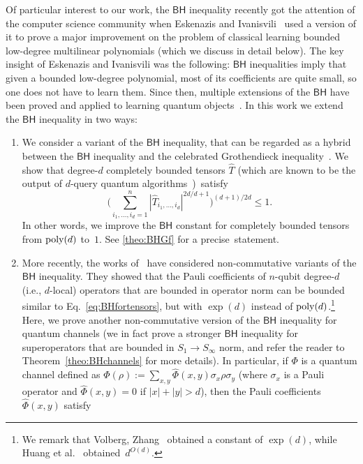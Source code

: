 \documentclass[11pt]{article}
\newcommand{\BH}{\textsf{BH}}
\theoremstyle{plain}
\newcommand{\poly}{\mbox{\rm poly}}
\theoremstyle{plain}
\theoremstyle{definition}
\theoremstyle{remark}
\theoremstyle{named}
\begin{document}
Of particular interest to our work, the $\BH$ inequality recently got the attention of the computer science community when  Eskenazis and Ivanisvili~\cite{eskenazis2022learning} used a version of it to prove a major improvement on the problem of classical learning bounded low-degree multilinear polynomials (which we discuss in detail below).
The key insight of Eskenazis and Ivanisvili was the following: $\BH$ inequalities imply that given a bounded low-degree polynomial, most of its coefficients are quite small, so one does not have to learn them. Since then, multiple extensions of the $\BH$ have been proved and applied to learning quantum  objects~\cite{huang2022learning,slote2023bohnenblust,slote2023noncommutative,volberg2023noncommutative,klein_et_al:LIPIcs.ITCS.2024.69}. In this work we extend the $\BH$ inequality in two ways: 
\begin{enumerate}
    \item We consider a variant of the $\BH$ inequality, that can be regarded as a hybrid between the $\BH$ inequality and the celebrated Grothendieck inequality~\cite{grothendieck1953resume}.  We show that degree-$d$ completely bounded tensors $\widehat T$ (which are known to be the output of $d$-query  quantum  algorithms~\cite{QQA=CBF})~satisfy
  $$
    \Big(\sum_{i_1,\ldots,i_d=1}^n |\widehat T_{i_1,\ldots,i_d}|^{2d/d+1}\Big)^{(d+1)/2d}\leq 1.
    $$
    In other words, we improve the $\BH$ constant for completely bounded tensors from $\poly(d)$ to~$1$. See \cref{theo:BHGf} for a precise~statement. 
    \item  More recently, the works of~\cite{huang2022learning,volberg2023noncommutative} have considered non-commutative variants of the $\BH$ inequality. They showed that the Pauli coefficients of $n$-qubit degree-$d$ (i.e., $d$-local) operators that are bounded in operator norm  can be bounded similar to Eq.~\eqref{eq:BHfortensors}, but with $\exp (d)$ instead of $\poly(d)$.\footnote{We remark that Volberg, Zhang~\cite{volberg2023noncommutative} obtained a constant of $\exp(d)$, while Huang et al.~\cite{huang2022learning} obtained~$d^{O(d)}$.} 
    Here, we prove another non-commutative version of the $\BH$ inequality for quantum channels (we in fact prove a stronger $\BH$ inequality for superoperators that are bounded in $S_1\to S_\infty$ norm, and refer the reader to Theorem~\ref{theo:BHchannels} for more details). 
 In particular, if $\Phi$ is a quantum channel defined as $\Phi(\rho):=\sum_{x,y} \widehat{\Phi}(x,y)\sigma_x \rho \sigma_y$ (where $\sigma_x$ is a Pauli operator and $\widehat{\Phi}(x,y)=0$ if $|x|+|y|>d$), then the Pauli coefficients $\widehat{\Phi}(x,y)$ satisfy  

\end{enumerate}
\end{document}
